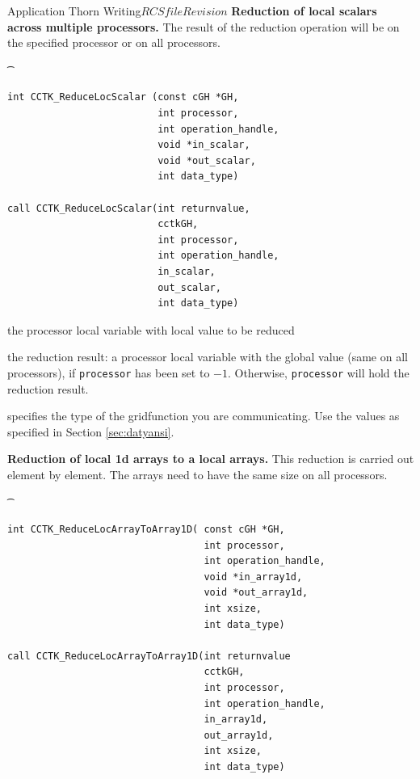 \begin{cactuspart}{Application Thorn Writing}{$RCSfile$}{$Revision$}
{\bf Reduction of local scalars across multiple processors.} The result of 
the reduction operation will be on the specified processor or on all processors.

{\t
\begin{verbatim}
int CCTK_ReduceLocScalar (const cGH *GH, 
                          int processor, 
                          int operation_handle,
                          void *in_scalar, 
                          void *out_scalar, 
                          int data_type)

call CCTK_ReduceLocScalar(int returnvalue,
                          cctkGH,
                          int processor,
                          int operation_handle,
                          in_scalar,
                          out_scalar,
                          int data_type)
\end{verbatim}
}
\begin{Lentry}
\item[\texttt{in\_scalar}] the processor local variable with local value to be reduced
\item[\texttt{out\_scalar}] the reduction result: a processor local variable 
with the global value (same on all processors), if \texttt{processor} has been
set to $-1$. Otherwise, \texttt{processor} will hold the reduction result.
\item[\texttt{data\_type}]
specifies the type of the gridfunction 
you are communicating. Use the values as specified in Section
\ref{sec:datyansi}.
\end{Lentry}

\vskip 0.25cm

{\bf Reduction of local 1d arrays to a local arrays.} This reduction is carried
out element by element. The arrays need to have the same size on all
processors.
{\t
\begin{verbatim}
int CCTK_ReduceLocArrayToArray1D( const cGH *GH, 
                                  int processor,
                                  int operation_handle,
                                  void *in_array1d, 
                                  void *out_array1d, 
                                  int xsize,
                                  int data_type)

call CCTK_ReduceLocArrayToArray1D(int returnvalue
                                  cctkGH,
                                  int processor,
                                  int operation_handle,
                                  in_array1d,
                                  out_array1d,
                                  int xsize,
                                  int data_type)
\end{verbatim}
}


\end{cactuspart}
